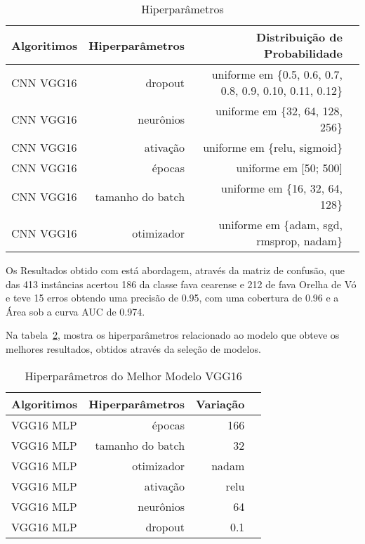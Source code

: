 \begin{table}[H]
\centering
\caption{Hiperparâmetros}
\label{tabela:hiperparametros_vgg}
\def\arraystretch{1.2}
\begin{tabular}{@{}lrrr@{}}
\toprule
{\textbf{Algoritimos}} & {\textbf{Hiperparâmetros}} & {\textbf{Distribuição de Probabilidade}}  \\
\midrule
CNN VGG16 & dropout & uniforme em \{0.5, 0.6, 0.7, 0.8, 0.9, 0.10, 0.11, 0.12\} \\ 
CNN VGG16 & neurônios & uniforme em \{32, 64, 128, 256\} \\ 
CNN VGG16 & ativação & uniforme em \{relu, sigmoid\} \\ 
CNN VGG16 & épocas & uniforme em [50; 500] \\ 
CNN VGG16 & tamanho do batch & uniforme em \{16, 32, 64, 128\} \\ 
CNN VGG16 & otimizador & uniforme em \{adam, sgd, rmsprop, nadam\} \\ 
\bottomrule
\end{tabular}
\end{table}

Os Resultados obtido com está abordagem, através da matriz de confusão, que das 413 instâncias acertou 186 da classe fava cearense e 212 de fava Orelha de Vó e teve 15 erros obtendo uma precisão de 0.95, com uma cobertura de 0.96 e a Área sob a curva AUC de 0.974.

Na tabela~\ref{tabela:hiperparametros_best_models_vgg_}, mostra os hiperparâmetros relacionado ao modelo que obteve os melhores resultados, obtidos através da seleção de modelos.

\begin{table}[H]
\centering
\caption{Hiperparâmetros do Melhor Modelo VGG16}
\label{tabela:hiperparametros_best_models_vgg_}
\def\arraystretch{1.2}
\begin{tabular}{@{}lrrr@{}}
\toprule
{\textbf{Algoritimos}} & {\textbf{Hiperparâmetros}} & {\textbf{Variação}}  \\
\midrule
VGG16 MLP & épocas & 166 \\ 
VGG16 MLP & tamanho do batch & 32\\ 
VGG16 MLP & otimizador & nadam \\
VGG16 MLP & ativação & relu \\
VGG16 MLP & neurônios & 64 \\
VGG16 MLP & dropout & 0.1 \\
\bottomrule
\end{tabular}
\end{table}






















